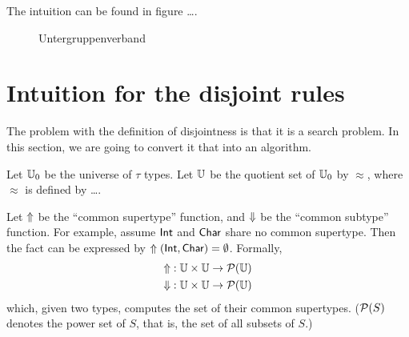 \documentclass[preprint]{sigplanconf}
\begin{document}
The intuition can be found in figure \ldots.

\begin{figure}

\centering
\newcommand{\mydistance}{.6cm}
\caption{Untergruppenverband}
\end{figure}

\section{Intuition for the disjoint rules}

The problem with the definition of disjointness is that it is a search problem. In this section, we are going to convert it that into an algorithm.

Let $\mathbb{U}_0$ be the universe of $\tau$ types. Let $\mathbb{U}$ be the quotient set of $\mathbb{U}_0$ by $\approx$, where $\approx$ is defined by \ldots.

Let $\Uparrow$ be the ``common supertype'' function, and $\Downarrow$ be the ``common subtype'' function. For example, assume $\textsf{Int}$ and $\textsf{Char}$ share no common supertype. Then the fact can be expressed by $\Uparrow(\textsf{Int},\textsf{Char})=\emptyset$. Formally,
\begin{align*}
  \Uparrow &: \mathbb{U} \times \mathbb{U} \to \mathcal{P}(\mathbb{U}) \\
  \Downarrow   &: \mathbb{U} \times \mathbb{U} \to \mathcal{P}(\mathbb{U})
\end{align*}
which, given two types, computes the set of their common supertypes. ($\mathcal{P}(S)$ denotes the power set of $S$, that is, the set of all subsets of $S$.)
\end{document}
